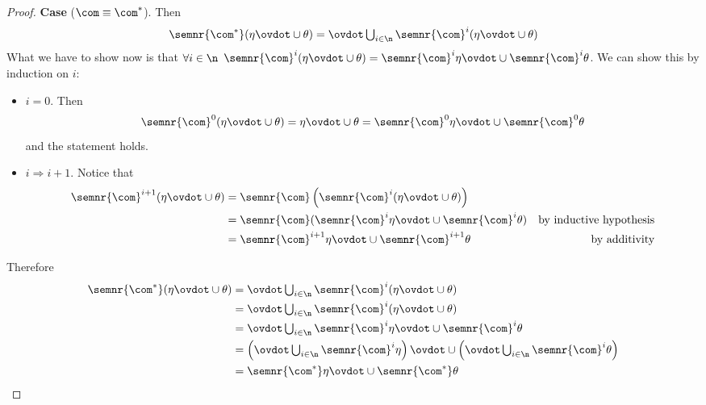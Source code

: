 \begin{proof}
  \noindent
  \textbf{Case}  (\(\com \equiv \com^*\)).
  Then
  \begin{equation*}
    \semnr{\com^*}(\eta\ovdot\cup\theta) = \textstyle \ovdot\bigcup_{i\in\n} \semnr{\com}^i(\eta \ovdot\cup \theta) \\
  \end{equation*}
  What we have to show now is that \(\forall i \in \n\)
  \(\semnr{\com}^i(\eta \ovdot\cup \theta) = \semnr{\com}^i \eta \ovdot\cup
  \semnr{\com}^i\theta\). We can show this by induction on \(i\):
  \begin{itemize}
    \item  \(i=0\). Then
    \begin{equation*}
      \semnr{\com}^0(\eta\ovdot\cup\theta) = \eta\ovdot\cup\theta = \semnr{\com}^0\eta \ovdot\cup \semnr{\com}^0\theta
    \end{equation*}
    and the statement holds.
    \item  \(i \Rightarrow i + 1\). Notice that
    \begin{align*}
      \semnr{\com}^{i+1}(\eta \ovdot\cup \theta) & = \semnr{\com}\left(\semnr{\com}^i(\eta \ovdot\cup \theta)\right) \\
                                             & = \semnr{\com}(\semnr{\com}^i\eta \ovdot\cup \semnr{\com}^i\theta) & \text{by inductive hypothesis} \\
                                             & = \semnr{\com}^{i+1}\eta \ovdot\cup \semnr{\com}^{i+1}\theta & \text{by additivity}
    \end{align*}
  \end{itemize}
  Therefore
  \begin{align*}
    \semnr{\com^*}(\eta\ovdot\cup\theta) & = \textstyle \ovdot\bigcup_{i\in\n} \semnr{\com}^i(\eta \ovdot\cup \theta) \\
                                     & = \textstyle \ovdot\bigcup_{i\in\n}\semnr{\com}^i(\eta \ovdot\cup \theta) \\
                                     & = \textstyle \ovdot\bigcup_{i\in\n}\semnr{\com}^i\eta \ovdot\cup \semnr{\com}^i\theta \\
                                     & = \left(\textstyle \ovdot\bigcup_{i\in\n} \semnr{\com}^i\eta\right) \ovdot\cup \left(\textstyle \ovdot\bigcup_{i\in\n} \semnr{\com}^i\theta\right) \\
                                     & = \semnr{\com^*} \eta \ovdot\cup \semnr{\com^*}\theta
  \end{align*}
\end{proof}


